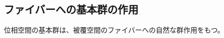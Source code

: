 \documentclass[report]{jlreq}
\def\assetspath{../}
\begin{document}
\subsection{ファイバーへの基本群の作用}

位相空間の基本群は、被覆空間のファイバーへの自然な群作用をもつ。

\TODO{}

%
%
%
%
%
%
%
\end{document}
